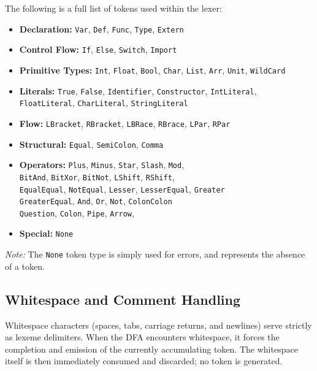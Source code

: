 \documentclass[11pt, a4paper]{article}
\begin{document}
The following is a full list of tokens used within the lexer:
\begin{itemize}
    \item \textbf{Declaration: } \texttt{Var},  \texttt{Def},  \texttt{Func},  \texttt{Type}, \texttt{Extern}
    \item \textbf{Control Flow: } \texttt{If},  \texttt{Else},  \texttt{Switch},  \texttt{Import}
    \item \textbf{Primitive Types: } \texttt{Int},  \texttt{Float},  \texttt{Bool},  \texttt{Char},  \texttt{List},  \texttt{Arr},  \texttt{Unit}, \texttt{WildCard}
    \item \textbf{Literals: } \texttt{True},  \texttt{False},  \texttt{Identifier},  \texttt{Constructor},  \texttt{IntLiteral},\\\texttt{FloatLiteral},  \texttt{CharLiteral},  \texttt{StringLiteral}
    \item \textbf{Flow: } \texttt{LBracket},  \texttt{RBracket},  \texttt{LBRace},  \texttt{RBrace},  \texttt{LPar},  \texttt{RPar} 
    \item \textbf{Structural: } \texttt{Equal},  \texttt{SemiColon},  \texttt{Comma}
    \item \textbf{Operators: } \texttt{Plus},  \texttt{Minus},  \texttt{Star},  \texttt{Slash},  \texttt{Mod},\\
    \texttt{BitAnd},  \texttt{BitXor},  \texttt{BitNot},  \texttt{LShift},  \texttt{RShift},\\  
    \texttt{EqualEqual},  \texttt{NotEqual},  \texttt{Lesser},  \texttt{LesserEqual},  \texttt{Greater}\\
    \texttt{GreaterEqual},  \texttt{And},  \texttt{Or},  \texttt{Not},  \texttt{ColonColon}\\
    \texttt{Question},  \texttt{Colon},  \texttt{Pipe},  \texttt{Arrow}, 
    \item \textbf{Special:} \texttt{None}
\end{itemize}

\textit{Note:} The \texttt{None} token type is simply used for errors, and represents the absence of a token.

\subsection{Whitespace and Comment Handling}

Whitespace characters (spaces, tabs, carriage returns, and newlines) serve strictly as lexeme delimiters. When the DFA encounters whitespace, it forces the completion and emission of the currently accumulating token. The whitespace itself is then immediately consumed and discarded; no token is generated. 
\end{document}
